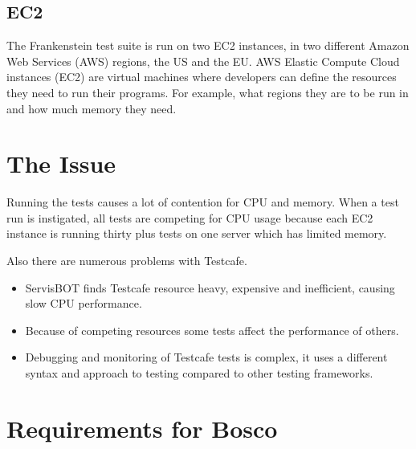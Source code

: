 \documentclass[12pt,a4paper,titlepage]{report}
\begin{document}
\subsection{EC2}
The Frankenstein test suite is run on two EC2 instances, in two different Amazon Web Services (AWS) regions, the US and the EU. 
AWS Elastic Compute Cloud instances (EC2) are virtual machines where developers can define the resources they need to run their programs. For example, what regions they are to be run in and how much memory they need. 
\section{The Issue}
Running the tests causes a lot of contention for CPU and memory. 
When a test run is instigated, all tests are competing for CPU usage because each EC2 instance is running thirty plus tests on one server which has limited memory.

Also there are numerous problems with Testcafe. 
\begin{itemize}
 \item ServisBOT finds Testcafe resource heavy, expensive and inefficient, causing slow CPU performance. 
 \item Because of competing resources some tests affect the performance of others. 
 \item Debugging and monitoring of Testcafe tests is complex, it uses a different syntax and approach to testing compared to other testing frameworks.
\end{itemize}

\section{Requirements for Bosco}
\end{document}
